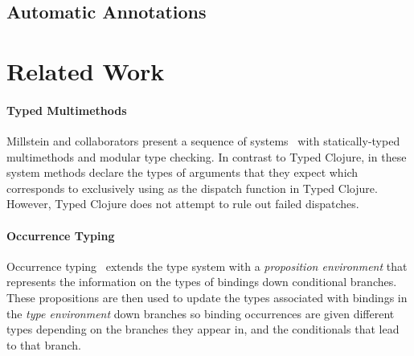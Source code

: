 \documentclass[9pt]{extarticle}
\begin{document}
\subsection{Automatic Annotations}



\section{Related Work}

\paragraph{Typed Multimethods} 
Millstein and collaborators present a sequence of
systems~\cite{Chambers:1992:OMC,Chambers:1994:TMM,MS02} with statically-typed multimethods
and modular type checking.  In contrast to Typed Clojure, in these
system methods declare the types of arguments that they expect which
corresponds to exclusively using  as the dispatch function
in Typed Clojure. However, Typed Clojure does not attempt to rule out
failed dispatches.


\paragraph{Occurrence Typing} 
Occurrence typing~\cite{TF08,TF10} extends the type 
system with a \emph{proposition environment} that represents 
the information on the types of bindings down conditional branches.
These propositions are then used to update the types associated
with bindings in the \emph{type environment} down branches
so binding occurrences are given different types 
depending on the branches they appear in, and the conditionals
that lead to that branch.




\end{document}

